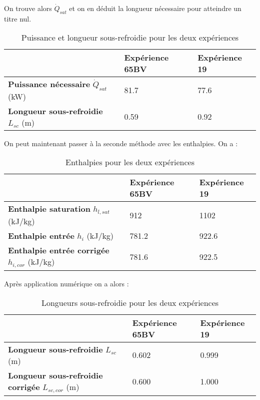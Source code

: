 On trouve alors $\dot{Q}_{sat}$ et on en déduit la longueur nécessaire pour atteindre un titre nul.
\begin{table}[H]
\caption{Puissance et longueur sous-refroidie pour les deux expériences}
\vspace{5pt}
    \centering
    \begin{tabular}{@{}lll@{}}
        \toprule
               & \textbf{Expérience 65BV}& \textbf{Expérience 19}\\
        \midrule
          \textbf{Puissance nécessaire} $\dot{Q}_{sat}$ (\si{kW}) & 81.7 & 77.6 \\
          \textbf{Longueur sous-refroidie} $L_{sc}$ (\si{m}) & 0.59 & 0.92 \\
        \bottomrule  
    \end{tabular}
    \label{donnes}
\end{table}

On peut maintenant passer à la seconde méthode avec les enthalpies. On a :
\begin{table}[H]
\caption{Enthalpies pour les deux expériences}
\vspace{5pt}
    \centering
    \begin{tabular}{@{}lll@{}}
        \toprule
               & \textbf{Expérience 65BV}& \textbf{Expérience 19}\\
        \midrule
          \textbf{Enthalpie saturation} $h_{l,sat}$ (\si{kJ/kg}) & 912 & 1102 \\
          \textbf{Enthalpie entrée} $h_{i}$ (\si{kJ/kg}) & 781.2 & 922.6 \\
          \textbf{Enthalpie entrée corrigée} $h_{i,cor}$ (\si{kJ/kg}) & 781.6 & 922.5 \\          
        \bottomrule  
    \end{tabular}
    \label{donnes}
\end{table}

Après application numérique on a alors :
\begin{table}[H]
\caption{Longueurs sous-refroidie pour les deux expériences}
\vspace{5pt}
    \centering
    \begin{tabular}{@{}lll@{}}
        \toprule
               & \textbf{Expérience 65BV}& \textbf{Expérience 19}\\
        \midrule
          \textbf{Longueur sous-refroidie} $L_{sc}$ (\si{m}) & 0.602 & 0.999 \\
          \textbf{Longueur sous-refroidie corrigée} $L_{sc,cor}$ (\si{m}) & 0.600 & 1.000 \\
        \bottomrule  
    \end{tabular}
    \label{donnes}
\end{table}

